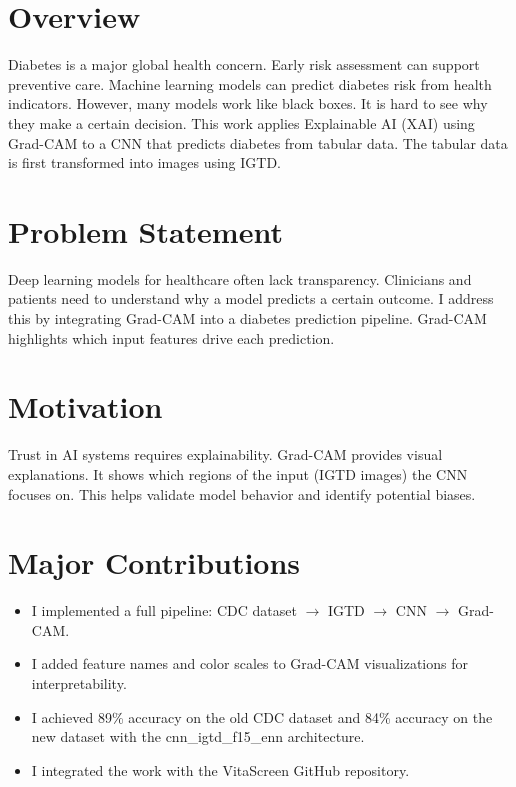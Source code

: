 \documentclass[12pt]{dalthesis}
\begin{document}
\section{Overview}

Diabetes is a major global health concern. Early risk assessment can support preventive care. Machine learning models can predict diabetes risk from health indicators. However, many models work like black boxes. It is hard to see why they make a certain decision. This work applies Explainable AI (XAI) using Grad-CAM to a CNN that predicts diabetes from tabular data. The tabular data is first transformed into images using IGTD.

\section{Problem Statement}

Deep learning models for healthcare often lack transparency. Clinicians and patients need to understand why a model predicts a certain outcome. I address this by integrating Grad-CAM into a diabetes prediction pipeline. Grad-CAM highlights which input features drive each prediction.

\section{Motivation}

Trust in AI systems requires explainability. Grad-CAM provides visual explanations. It shows which regions of the input (IGTD images) the CNN focuses on. This helps validate model behavior and identify potential biases.

\section{Major Contributions}

\begin{itemize}
\item I implemented a full pipeline: CDC dataset $\rightarrow$ IGTD $\rightarrow$ CNN $\rightarrow$ Grad-CAM.
\item I added feature names and color scales to Grad-CAM visualizations for interpretability.
\item I achieved 89\% accuracy on the old CDC dataset and 84\% accuracy on the new dataset with the cnn\_igtd\_f15\_enn architecture.
\item I integrated the work with the VitaScreen GitHub repository.
\end{itemize}
\end{document}
